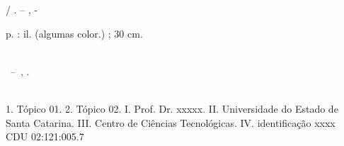 \imprimircapa

\imprimirfolhaderosto*

%     

\begin{fichacatalografica}
  \vspace*{\fill}					%
  \begin{center}					%
    \begin{minipage}[c]{12.5cm}		%

      \imprimirautor

      \hspace{0.5cm} \imprimirtitulo  / \imprimirautor. --
      \imprimirlocal, \imprimirdata-

      \hspace{0.5cm} \pageref{LastPage} p. : il. (algumas color.) ; 30 cm.\\

      \hspace{0.5cm} \imprimirorientadorRotulo~\imprimirorientador\\

      \hspace{0.5cm}
      \parbox[t]{\textwidth}{\imprimirtipotrabalho~--~\imprimirinstituicao,
      \imprimirdata.}\\

      \hspace{0.5cm}
      1. Tópico 01.
      2. Tópico 02.
      I. Prof. Dr. xxxxx.
      II. Universidade do Estado de Santa Catarina.
      III. Centro de Ciências Tecnológicas.
      IV. identificação xxxx\\ 

      \hspace{8.75cm} CDU 02:121:005.7\\

    \end{minipage}
  \end{center}
\end{fichacatalografica}

